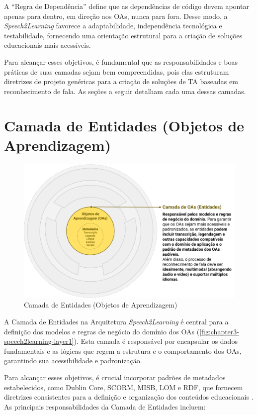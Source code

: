 A ``Regra de Dependência'' define que as dependências de código devem apontar apenas para dentro, em direção aos OAs, nunca para fora. Desse modo, a \textit{Speech2Learning} favorece a adaptabilidade, independência tecnológica e testabilidade, fornecendo uma orientação estrutural para a criação de soluções educacionais mais acessíveis. 

Para alcançar esses objetivos, é fundamental que as responsabilidades e boas práticas de suas camadas sejam bem compreendidas, pois elas estruturam diretrizes de projeto genéricas para a criação de soluções de TA baseadas em reconhecimento de fala. As seções a seguir detalham cada uma dessas camadas.

\section{Camada de Entidades (Objetos de Aprendizagem)}

\begin{figure}[htb]
\centering
\caption{Camada de Entidades (Objetos de Aprendizagem)}
\label{fig:chapter3-speech2learning-layer1}
\includegraphics[width=1\textwidth]{images/chapter3-speech2learning-layer1.png}
\end{figure}

A Camada de Entidades na Arquitetura \textit{Speech2Learning} é central para a definição dos modelos e regras de negócio do domínio dos OAs (\autoref{fig:chapter3-speech2learning-layer1}). Esta camada é responsável por encapsular os dados fundamentais e as lógicas que regem a estrutura e o comportamento dos OAs, garantindo sua acessibilidade e padronização. 

Para alcançar esses objetivos, é crucial incorporar padrões de metadados estabelecidos, como Dublin Core, SCORM, MISB, LOM e RDF, que fornecem diretrizes consistentes para a definição e organização dos conteúdos educacionais \cite{Santana2023}. As principais responsabilidades da Camada de Entidades incluem:

